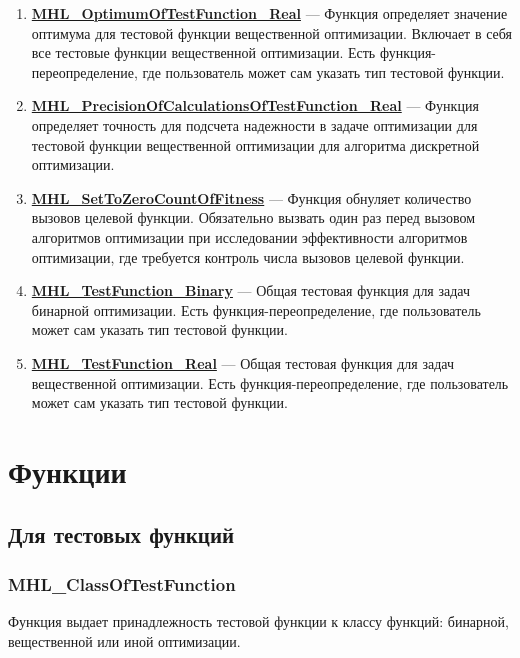 \documentclass[a4paper,12pt]{article}
\begin{document}
\begin{enumerate}
\item \textbf{\hyperref[MHL_OptimumOfTestFunction_Real]{MHL\_OptimumOfTestFunction\_Real}} --- Функция определяет значение оптимума для тестовой функции вещественной оптимизации. Включает в себя все тестовые функции вещественной оптимизации. Есть функция-переопределение, где пользователь может сам указать тип тестовой функции.

\item \textbf{\hyperref[MHL_PrecisionOfCalculationsOfTestFunction_Real]{MHL\_PrecisionOfCalculationsOfTestFunction\_Real}} --- Функция определяет точность для подсчета надежности в задаче оптимизации для тестовой функции вещественной оптимизации для алгоритма дискретной оптимизации.

\item \textbf{\hyperref[MHL_SetToZeroCountOfFitness]{MHL\_SetToZeroCountOfFitness}} --- Функция обнуляет количество вызовов целевой функции. Обязательно вызвать один раз перед вызовом алгоритмов оптимизации при исследовании эффективности    алгоритмов оптимизации, где требуется контроль числа вызовов целевой функции.

\item \textbf{\hyperref[MHL_TestFunction_Binary]{MHL\_TestFunction\_Binary}} --- Общая тестовая функция для задач бинарной оптимизации. Есть функция-переопределение, где пользователь может сам указать тип тестовой функции.

\item \textbf{\hyperref[MHL_TestFunction_Real]{MHL\_TestFunction\_Real}} --- Общая тестовая функция для задач вещественной оптимизации. Есть функция-переопределение, где пользователь может сам указать тип тестовой функции.

\end{enumerate}


\newpage
\section{Функции}
\subsection{Для тестовых функций}

\subsubsection{MHL\_ClassOfTestFunction}\label{MHL_ClassOfTestFunction}

Функция выдает принадлежность тестовой функции к классу функций: бинарной, вещественной или иной оптимизации.
\end{document}
